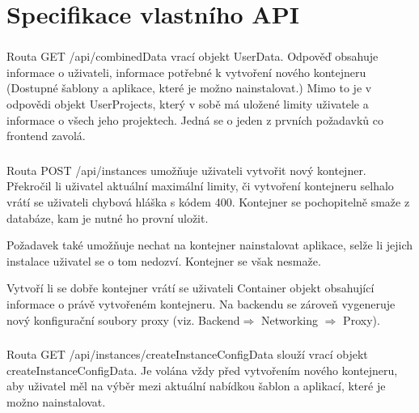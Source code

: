 \documentclass[a4paper,oneside,12pt]{report}
\begin{document}
\section{Specifikace vlastního API}


\subsubsection{\color{apiblue}{GET -- /api/combinedData}}

Routa GET /api/combinedData vrací objekt UserData.
Odpověď obsahuje informace o uživateli, informace potřebné k vytvoření nového kontejneru (Dostupné šablony a aplikace, které je možno nainstalovat.)
Mimo to je v odpovědi objekt UserProjects, který v sobě má uložené limity uživatele a informace o všech jeho projektech.
Jedná se o jeden z prvních požadavků co frontend zavolá.

\subsubsection{\color{apiblue}{POST -- /api/instances}}

Routa POST /api/instances umožňuje uživateli vytvořit nový kontejner.
Překročil li uživatel aktuální maximální limity, či vytvoření kontejneru selhalo vrátí se uživateli chybová hláška s kódem 400.
Kontejner se pochopitelně smaže z databáze, kam je nutné ho provní uložit.

Požadavek také umožňuje nechat na kontejner nainstalovat aplikace, selže li jejich instalace uživatel se o tom nedozví.
Kontejner se však nesmaže.

Vytvoří li se dobře kontejner vrátí se uživateli Container objekt obsahující informace o právě vytvořeném kontejneru.
Na backendu se zároveň vygeneruje nový konfigurační soubory proxy (viz. Backend$\Rightarrow$ Networking $\Rightarrow$ Proxy).


\subsubsection{\color{apiblue}{GET -- /api/instances/createInstanceConfigData}}

Routa GET /api/instances/createInstanceConfigData slouží vrací objekt createInstanceConfigData.
Je volána vždy před vytvořením nového kontejneru, aby uživatel měl na výběr mezi aktuální nabídkou šablon a aplikací, které je možno nainstalovat.

\subsubsection{}
\end{document}
